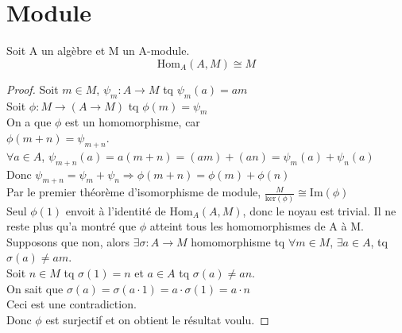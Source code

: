 \chapter{Module}

\begin{lemma}[MisoHomAM]
    \label{MisoHomAM}
    Soit A un algèbre et M un A-module.
    \[ \text{Hom}_{A}(A,M) \cong M \]
\end{lemma}
\begin{proof}
    Soit $m \in M$, $\psi_{m} : A \to M$ tq $\psi_{m}(a) = a m$\\
    Soit $\phi : M \to (A \to M)$ tq $\phi(m) = \psi_{m}$\\
    On a que $\phi$ est un homomorphisme, car\\
    $\phi(m+n) = \psi_{m+n}$.\\
    $\forall a \in A$, $\psi_{m+n}(a) = a (m+n) = (a m) + (a n) = \psi_{m}(a)+\psi_{n}(a)$\\
    Donc $\psi_{m+n} = \psi_{m}+\psi_{n} \Rightarrow \phi(m+n) = \phi(m)+\phi(n)$\\
    Par le premier théorème d'isomorphisme de module, $\frac{M}{\text{ker}(\phi)} \cong \text{Im}(\phi)$\\
    Seul $\phi(1)$ envoit à l'identité de $\text{Hom}_{A}(A,M)$, donc le noyau est trivial. Il ne reste plus qu'a montré que $\phi$ atteint tous les homomorphismes de A à M.\\
    Supposons que non, alors $\exists \sigma : A \to M$ homomorphisme tq $\forall m \in M$, $\exists a \in A$, tq $\sigma(a) \neq a m$.\\
    Soit $n \in M$ tq $\sigma(1)=n$ et $a \in A$ tq $\sigma(a) \neq a n$.\\
    On sait que $\sigma(a)=\sigma(a \cdot 1) = a\cdot \sigma (1) = a \cdot n$\\
    Ceci est une contradiction.\\
    Donc $\phi$ est surjectif et on obtient le résultat voulu.
\end{proof}